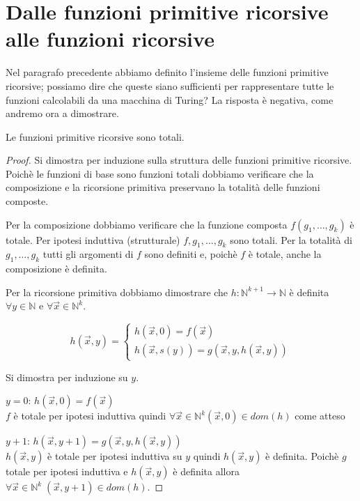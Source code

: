\section{Dalle funzioni primitive ricorsive alle funzioni ricorsive}

Nel paragrafo precedente abbiamo definito l'insieme delle funzioni
primitive ricorsive; possiamo dire che queste siano sufficienti per
rappresentare tutte le funzioni calcolabili da una macchina di Turing?
La risposta è negativa, come andremo ora a dimostrare.

\begin{proposizione}\label{PRsonoTotali}
Le funzioni primitive ricorsive sono totali.
\end{proposizione}
\begin{proof}
Si dimostra per induzione sulla struttura delle funzioni primitive
ricorsive.  Poichè le funzioni di base sono funzioni totali dobbiamo
verificare che la composizione e la ricorsione primitiva preservano la
totalità delle funzioni composte.

Per la composizione dobbiamo verificare che la funzione composta
$f(g_1, \dots, g_k)$ è totale. Per ipotesi induttiva
(strutturale) $f,g_1,\dots,g_k$ sono totali. Per la totalità di
$g_1,\dots,g_k$ tutti gli argomenti di $f$ sono definiti e, poichè $f$
è totale, anche la composizione è definita.

Per la ricorsione primitiva dobbiamo dimostrare che
$h:\mathbb{N}^{k+1} \to \mathbb{N}$ è definita $\forall y \in
\mathbb{N}$ e $\forall \vec{x} \in \mathbb{N}^k$.

$$h(\vec{x},y)=\left\{
\begin{array}{ll} h(\vec{x}, 0) = f(\vec{x})\\
                  h(\vec{x}, s(y)) = g(\vec{x},y,h(\vec{x},y))
\end{array} \right.$$

Si dimostra per induzione su $y$.

$y = 0$: $h(\vec{x}, 0) = f(\vec{x})$\\ $f$ è totale per ipotesi
induttiva quindi $\forall \vec{x} \in \mathbb{N}^k (\vec{x}, 0) \in
dom(h)$ come atteso

$y + 1$: $h(\vec{x}, y + 1) = g(\vec{x}, y, h(\vec{x}, y))$\\
$h(\vec{x}, y)$ è totale per ipotesi induttiva su $y$ quindi
$h(\vec{x}, y)$ è definita. Poichè $g$ totale per ipotesi induttiva e
$h(\vec{x}, y)$ è definita allora $\forall \vec{x} \in \mathbb{N}^k \;
(\vec{x}, y + 1) \in dom(h)$.
\end{proof}

